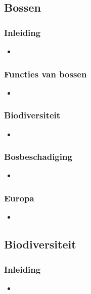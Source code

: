 \documentclass[12pt]{article}
\begin{document}
    \subsection{Bossen}
    \subsubsection*{Inleiding}
    \begin{itemize}
        \item 
    \end{itemize}

    \subsubsection*{Functies van bossen}
    \begin{itemize}
        \item 
    \end{itemize}

    \subsubsection*{Biodiversiteit}
    \begin{itemize}
        \item 
    \end{itemize}

    \subsubsection*{Bosbeschadiging}
    \begin{itemize}
        \item 
    \end{itemize}

    \subsubsection*{Europa}
    \begin{itemize}
        \item 
    \end{itemize}


    \subsection{Biodiversiteit}
    \subsubsection*{Inleiding}
    \begin{itemize}
        \item 
    \end{itemize}
\end{document}
